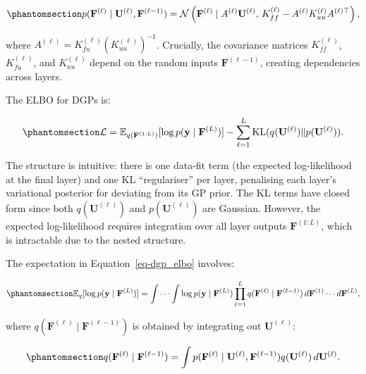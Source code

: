 \documentclass[
  letterpaper,
  DIV=11,
  numbers=noendperiod]{scrartcl}
\begin{document}
\begin{equation}\phantomsection\label{eq-dgp_layer_conditional}{
p(\mathbf{F}^{(\ell)} \mid \mathbf{U}^{(\ell)}, \mathbf{F}^{(\ell-1)}) = \mathcal{N}\left(\mathbf{F}^{(\ell)} \mid A^{(\ell)} \mathbf{U}^{(\ell)}, \, K^{(\ell)}_{ff} - A^{(\ell)} K^{(\ell)}_{uu} A^{(\ell)\top}\right),
}\end{equation}

where \(A^{(\ell)} = K^{(\ell)}_{fu} (K^{(\ell)}_{uu})^{-1}\).
Crucially, the covariance matrices \(K^{(\ell)}_{ff}\),
\(K^{(\ell)}_{fu}\), and \(K^{(\ell)}_{uu}\) depend on the random inputs
\(\mathbf{F}^{(\ell-1)}\), creating dependencies across layers.

The ELBO for DGPs is:

\begin{equation}\phantomsection\label{eq-dgp_elbo}{
\mathcal{L} = \mathbb{E}_{q(\mathbf{F}^{(1:L)})}[\log p(\mathbf{y} \mid \mathbf{F}^{(L)})] - \sum_{\ell=1}^{L} \operatorname{KL}(q(\mathbf{U}^{(\ell)}) \| p(\mathbf{U}^{(\ell)})).
}\end{equation}

The structure is intuitive: there is one data-fit term (the expected
log-likelihood at the final layer) and one KL ``regulariser'' per layer,
penalising each layer's variational posterior for deviating from its GP
prior. The KL terms have closed form since both
\(q(\mathbf{U}^{(\ell)})\) and \(p(\mathbf{U}^{(\ell)})\) are Gaussian.
However, the expected log-likelihood requires integration over all layer
outputs \(\mathbf{F}^{(1:L)}\), which is intractable due to the nested
structure.

The expectation in Equation~\ref{eq-dgp_elbo} involves:

\begin{equation}\phantomsection\label{eq-dgp_nested_expectation}{
\mathbb{E}_{q}[\log p(\mathbf{y} \mid \mathbf{F}^{(L)})] = \int \cdots \int \log p(\mathbf{y} \mid \mathbf{F}^{(L)}) \prod_{\ell=1}^{L} q(\mathbf{F}^{(\ell)} \mid \mathbf{F}^{(\ell-1)}) \, d\mathbf{F}^{(1)} \cdots d\mathbf{F}^{(L)},
}\end{equation}

where \(q(\mathbf{F}^{(\ell)} \mid \mathbf{F}^{(\ell-1)})\) is obtained
by integrating out \(\mathbf{U}^{(\ell)}\):

\begin{equation}\phantomsection\label{eq-marginal_q_layer}{
q(\mathbf{F}^{(\ell)} \mid \mathbf{F}^{(\ell-1)}) = \int p(\mathbf{F}^{(\ell)} \mid \mathbf{U}^{(\ell)}, \mathbf{F}^{(\ell-1)}) q(\mathbf{U}^{(\ell)}) \, d\mathbf{U}^{(\ell)}.
}\end{equation}
\end{document}
